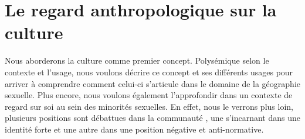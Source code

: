 \section{Le regard anthropologique sur la culture}
\label{subsec:le_regard_anthropologique_sur_la_culture}
Nous aborderons la culture comme premier concept.
Polysémique selon le contexte et l'usage, nous voulons décrire ce concept et ses différents usages pour arriver à comprendre comment celui-ci s'articule dans le domaine de la géographie sexuelle.
Plus encore, nous voulons également l'approfondir dans un contexte de regard sur soi au sein des minorités sexuelles.
En effet, nous le verrons plus loin, plusieurs positions sont débattues dans la communauté \lgbt{}, une s'incarnant dans une identité forte et une autre dans une position négative et anti-normative.


